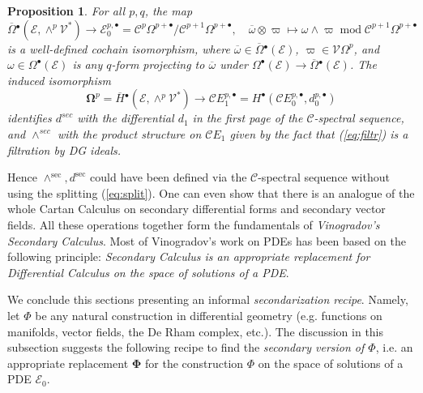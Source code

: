 \documentclass{conm-p-l}
\newtheorem{proposition}[theorem]{Proposition}
\theoremstyle{definition}
\theoremstyle{remark}
\numberwithin{equation}{section}
\begin{document}
\begin{proposition}
For all $p, q$, the map
\[
\overline \Omega{}^\bullet (\mathscr E, \wedge^p \mathscr V^\ast) \to \mathscr E_0^{p,\bullet} = \mathscr C^p \Omega^{p+\bullet} / \mathscr C^{p+1} \Omega^{p+\bullet}, \quad \overline \omega \otimes \varpi \mapsto \omega \wedge \varpi \operatorname{mod} \mathscr C^{p+1} \Omega^{p+\bullet}
\]
is a well-defined cochain isomorphism, where $\overline \omega \in \overline \Omega{}^\bullet (\mathscr E)$, $\varpi \in \mathscr V \Omega^p$, and $\omega \in \Omega^\bullet (\mathscr E)$ is any $q$-form projecting to $\overline \omega$ under $\Omega^\bullet (\mathscr E) \to \overline \Omega{}^\bullet (\mathscr E)$. The induced isomorphism
\[
\boldsymbol \Omega^p = \overline H{}^\bullet (\mathscr E, \wedge^p \mathscr V^\ast) \to \mathscr C E^{p, \bullet}_1 = H^\bullet (\mathscr C E^{p, \bullet}_0, d_0^{p, \bullet})
\]
identifies $d^{sec}$ with the differential $d_1$ in the first page of the $\mathscr C$-spectral sequence, and $\wedge^{sec}$ with the product structure on $\mathscr C E_1$ given by the fact that (\ref{eq:filtr}) is a filtration by DG ideals.
\end{proposition}

Hence $\wedge^{\mathrm{sec}}, d^{\mathrm{sec}}$ could have been defined via the $\mathscr C$-spectral sequence without using the splitting (\ref{eq:split}). One can even show that there is an analogue of the whole Cartan Calculus on secondary differential forms and secondary vector fields. All these operations together form the fundamentals of \emph{Vinogradov's Secondary Calculus}. Most of Vinogradov's work on PDEs has been based on the following principle: \emph{Secondary Calculus is an appropriate replacement for Differential Calculus on the space of solutions of a PDE}.

We conclude this sections presenting an informal \emph{secondarization recipe}. Namely, let $\Phi$ be any natural construction in differential geometry (e.g.{} functions on manifolds, vector fields, the De Rham complex, etc.). The discussion in this subsection suggests the following recipe to find the \emph{secondary version of $\Phi$}, i.e.{} an appropriate replacement $\boldsymbol \Phi$ for the construction $\Phi$ on the space of solutions of a PDE $\mathscr E_0$.
\end{document}
